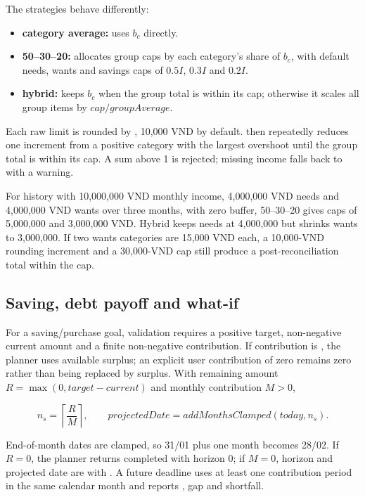 The strategies behave differently:

\begin{itemize}
  \item \textbf{category average:} uses $b_c$ directly.
  \item \textbf{50--30--20:} allocates group caps by each category's share of $b_c$, with default needs, wants and savings caps of $0.5I$, $0.3I$ and $0.2I$.
  \item \textbf{hybrid:} keeps $b_c$ when the group total is within its cap; otherwise it scales all group items by $cap/groupAverage$.
\end{itemize}

Each raw limit is rounded by , 10,000 VND by default.  then repeatedly reduces one increment from a positive category with the largest overshoot until the group total is within its cap. A sum  above 1 is rejected; missing income falls back to  with a warning.

For history with 10,000,000 VND monthly income, 4,000,000 VND needs and 4,000,000 VND wants over three months, with zero buffer, 50--30--20 gives caps of 5,000,000 and 3,000,000 VND. Hybrid keeps needs at 4,000,000 but shrinks wants to 3,000,000. If two wants categories are 15,000 VND each, a 10,000-VND rounding increment and a 30,000-VND cap still produce a post-reconciliation total within the cap.

\subsection{Saving, debt payoff and what-if}

For a saving/purchase goal, validation requires a positive target, non-negative current amount and a finite non-negative contribution. If contribution is , the planner uses available surplus; an explicit user contribution of zero remains zero rather than being replaced by surplus. With remaining amount $R=\max(0,target-current)$ and monthly contribution $M>0$,

\begin{equation}
  n_s=\left\lceil\frac{R}{M}\right\rceil,
  \qquad projectedDate=addMonthsClamped(today,n_s).
\end{equation}

End-of-month dates are clamped, so 31/01 plus one month becomes 28/02. If $R=0$, the planner returns completed with horizon 0; if $M=0$, horizon and projected date are  with . A future deadline uses at least one contribution period in the same calendar month and reports , gap and shortfall.

